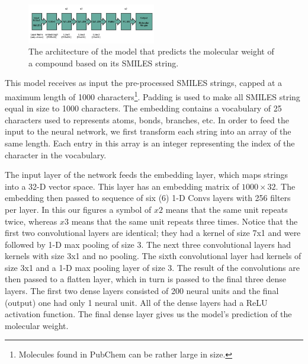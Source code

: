         \begin{figure}[htbp]
        \centering
        \includegraphics[width=0.5\textwidth]{figures/MW-model_arquitecture.jpg}
        \caption{The architecture of the model that predicts the molecular weight of a compound based on its SMILES string.}
        \label{fig:mw-architecture}
    \end{figure}
    This model  receives as input the pre-processed SMILES strings, capped at a maximum length of 1000 characters\footnote{Molecules found in PubChem can be rather large in size.}. Padding is used to make all SMILES string equal in size to 1000 characters. The embedding contains a vocabulary of 25 characters used to represents atoms, bonds, branches, etc. In order to feed the input to the neural network, we first transform each string into an array of the same length. Each entry 
    in this array is an integer representing the index of the character in the vocabulary. 
    
    The input layer of the network feeds the embedding layer, which maps strings into a  32-D vector space. This layer has an embedding matrix 
    of  $1000 \times 32$. The embedding then passed to sequence of six (6)  1-D Convs layers with 256 filters per layer. 
    In this our figures a symbol of $x2$ means that the same unit repeats twice, whereas $x3$ means that the same unit repeats three times. 
Notice that the first two convolutional layers are identical; they had a kernel of size 7x1 and were followed by 1-D max pooling of size 3.
The next three convolutional  layers had  kernels with size 3x1 and no pooling. The sixth convolutional layer had kernels of size 3x1 
and a 1-D max pooling layer of size 3. The result of the convolutions are then passed to a flatten layer, which in turn is passed to the final three dense layers. The first two dense layers consisted of 200 neural units and the final (output) one had only 1 neural unit. All of the dense layers had a ReLU activation function. The final  dense layer gives us the model's prediction of the molecular weight.

